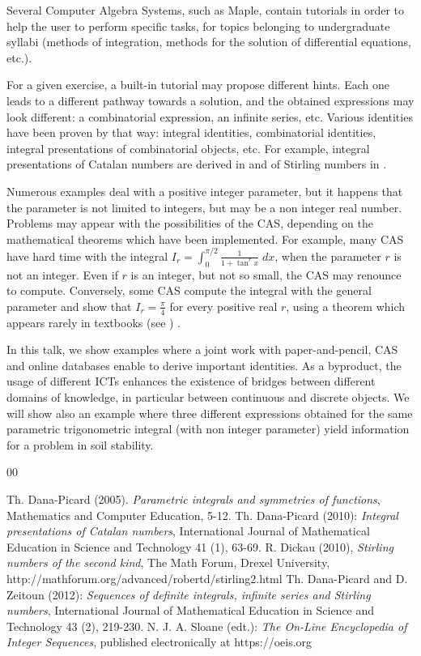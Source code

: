 \documentclass[11pt]{article}
\begin{document}
Several Computer Algebra Systems, such as Maple,  contain tutorials in order to help the user to perform specific tasks, for topics belonging to undergraduate syllabi (methods of integration, methods for the solution of differential equations, etc.).

For a given exercise, a built-in tutorial may propose different hints. Each one leads to a different pathway towards a solution, and the obtained expressions may look different: a combinatorial expression, an infinite series, etc. Various identities have been proven by that way: integral identities, combinatorial identities, integral presentations of combinatorial objects, etc. For example, integral presentations of Catalan numbers are derived in \cite{catalan} and of Stirling numbers in \cite{stirling}.

Numerous examples deal with a positive integer parameter, but it happens that the parameter is not limited to integers, but may be a non integer real number. Problems may appear with the possibilities of the CAS, depending on the mathematical theorems which have been implemented. For example, many CAS have hard time with the integral $I_r=\int_0^{\pi /2} \frac{1}{1+\tan ^r x} \; dx$, when the parameter $r$ is not an integer. Even if $r$ is an integer, but not so small, the CAS may renounce to compute. Conversely, some CAS compute the integral with the general parameter and show that  $I_r=\frac{\pi}{4}$ for every positive real $r$, using a theorem which appears rarely in textbooks (see \cite{symmetries}) .

In this talk, we show examples where a joint work with paper-and-pencil, CAS and online databases enable to derive important identities. As a byproduct, the usage of different ICTs enhances the existence of bridges between different domains of knowledge, in  particular between continuous and discrete objects.  We will show also an example where three different expressions obtained for the same parametric trigonometric integral (with non integer parameter) yield information for a problem in soil stability.


\begin{thebibliography}{00}
\setlength{\itemsep}{-1mm}
\footnotesize
{} Th. Dana-Picard (2005). \emph{Parametric integrals and symmetries of functions}, Mathematics and Computer Education, 5-12.
 Th. Dana-Picard (2010): \textit{Integral presentations of Catalan numbers}, International Journal of Mathematical Education in Science and Technology 41 (1), 63-69.
 R. Dickau (2010), \emph{Stirling numbers of the second kind}, The Math Forum, Drexel University, http://mathforum.org/advanced/robertd/stirling2.html
 Th. Dana-Picard and D. Zeitoun (2012): \emph{Sequences of definite integrals, infinite series and Stirling numbers}, International Journal of Mathematical Education in Science and Technology 43 (2), 219-230.
 N. J. A. Sloane (edt.): \emph{The On-Line Encyclopedia of Integer Sequences}, published electronically at https://oeis.org

\end{thebibliography}
\normalsize
\end{document}
